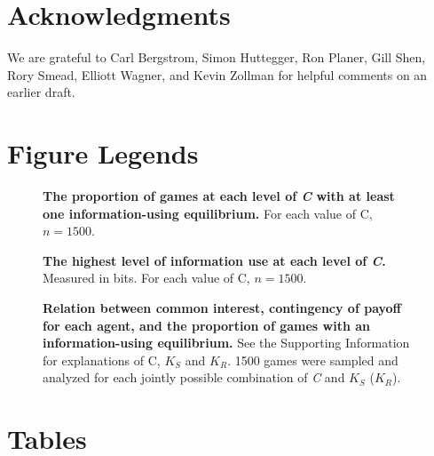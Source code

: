 \documentclass[10pt]{article}
\begin{document}
\section*{Acknowledgments}

We are grateful to Carl Bergstrom, Simon Huttegger, Ron Planer, Gill
Shen, Rory Smead, Elliott Wagner, and Kevin Zollman for helpful comments
on an earlier draft.



\pagebreak
\section*{Figure Legends}
\begin{figure}[!ht]
\begin{center}
\end{center}
\caption{
{\bf The proportion of games at each level of \emph{C} with
at least one information-using equilibrium.} For each value of C,
$n=1500$.}
\label{Figure_label}
\end{figure}

\begin{figure}[!ht]
\begin{center}
\end{center}
\caption{
{\bf The highest level of information use at each level of \emph{C}.} Measured in bits. For each value of C, $n=1500$.}
\label{Figure_label}
\end{figure}

\begin{figure}[!ht]
\begin{center}
\end{center}
\caption{
    {\bf Relation between common interest,
contingency of payoff for each agent, and the proportion of games with
an information-using equilibrium.} See the Supporting Information for explanations of
C, $K_S$ and $K_R$. 1500 games were sampled and analyzed for each
jointly possible combination of \emph{C} and $K_S$ ($K_R$).}
\label{Figure_label}
\end{figure}
\pagebreak
\section*{Tables}
\end{document}
